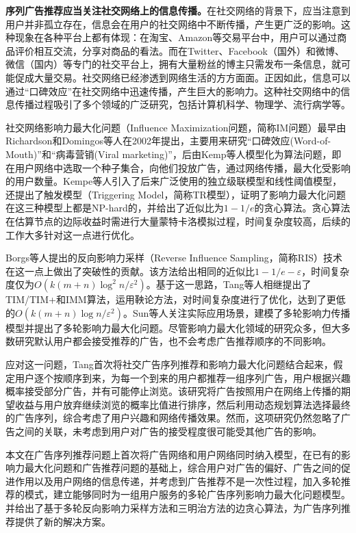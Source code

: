 \textbf{序列广告推荐应当关注社交网络上的信息传播。}在社交网络的背景下，应当注意到用户并非孤立存在，信息会在用户的社交网络中不断传播，产生更广泛的影响。这种现象在各种平台上都有体现：在淘宝、Amazon等交易平台中，用户可以通过商品评价相互交流，分享对商品的看法。而在Twitter、Facebook（国外）和微博、微信（国内）等专门的社交平台上，拥有大量粉丝的博主只需发布一条信息，就可能促成大量交易。社交网络已经渗透到网络生活的方方面面。正因如此，信息可以通过“口碑效应”在社交网络中迅速传播，产生巨大的影响力。这种社交网络中的信息传播过程吸引了多个领域的广泛研究，包括计算机科学、物理学、流行病学等\cite{li2018influence}。

社交网络影响力最大化问题（Influence Maximization问题，简称IM问题）最早由Richardson和Domingos等人\cite{richardson2002mining}在2002年提出，主要用来研究“口碑效应(Word-of-Mouth)”和“病毒营销(Viral marketing)”，后由Kemp等人\cite{kempe2003maximizing}模型化为算法问题，即在用户网络中选取一个种子集合，向他们投放广告，通过网络传播，最大化受影响的用户数量。Kempe等人引入了后来广泛使用的独立级联模型\cite{goldenberg2001talk}和线性阈值模型\cite{granovetter1978threshold}，还提出了触发模型（Triggering Model，简称TR模型），证明了影响力最大化问题在这三种模型上都是NP-hard的，并给出了近似比为$1-1/e$的贪心算法。贪心算法在估算节点的边际收益时需进行大量蒙特卡洛模拟过程，时间复杂度较高，后续的工作大多针对这一点进行优化。

Borgs等人\cite{borgs2014maximizing}提出的反向影响力采样（Reverse Influence Sampling，简称RIS）技术在这一点上做出了突破性的贡献。该方法给出相同的近似比$1-1/e-\varepsilon$，时间复杂度仅为$O(k(m+n)\log^2n/\varepsilon^2)$。基于这一思路，Tang等人相继提出了TIM/TIM+\cite{tang2014influence}和IMM\cite{tang2015influence}算法，运用鞅论方法，对时间复杂度进行了优化，达到了更低的$O(k(m+n)\log n/\varepsilon^2)$。Sun等人关注实际应用场景，建模了多轮影响力传播模型并提出了多轮影响力最大化问题\cite{mrim}。尽管影响力最大化领域的研究众多，但大多数研究默认用户都会接受推荐的广告，也不会考虑广告推荐顺序的不同影响。

应对这一问题，Tang\cite{tang2018social}首次将社交广告序列推荐和影响力最大化问题结合起来，假定用户逐个按顺序到来，为每一个到来的用户都推荐一组序列广告，用户根据兴趣概率接受部分广告，并有可能停止浏览。该研究将广告按照用户在网络上传播的期望收益与用户放弃继续浏览的概率比值进行排序，然后利用动态规划算法选择最终的广告序列，综合考虑了用户兴趣和网络传播效果。然而，这项研究仍然忽略了广告之间的关联，未考虑到用户对广告的接受程度很可能受其他广告的影响。

本文在广告序列推荐问题上首次将广告网络和用户网络同时纳入模型，在已有的影响力最大化问题和广告推荐问题的基础上，综合用户对广告的偏好、广告之间的促进作用以及用户网络的信息传递，并考虑到广告推荐不是一次性过程，加入多轮推荐的模式，建立能够同时为一组用户服务的多轮广告序列影响力最大化问题模型。并给出了基于多轮反向影响力采样方法和三明治方法的边贪心算法，为广告序列推荐提供了新的解决方案。

